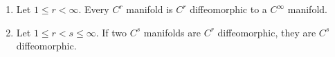 \begin{enumerate}
\item[(a)] Let $1 \leqslant r < \infty$. Every $C^r$ manifold is $C^r$ diffeomorphic to a $C^\infty$ manifold.
\item[(b)] Let $1 \leqslant r < s \leqslant \infty$. If two $C^s$ manifolds are $C^r$ diffeomorphic, they are $C^s$ diffeomorphic.
\end{enumerate}
